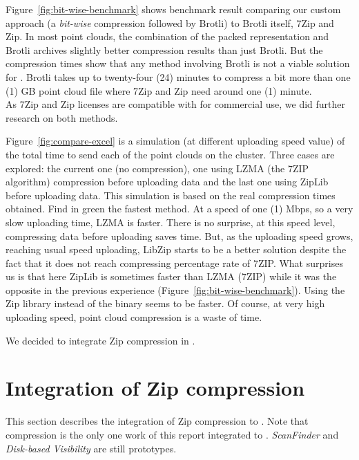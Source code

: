 Figure~\ref{fig:bit-wise-benchmark} shows benchmark result comparing our custom approach (a \emph{bit-wise} compression followed by Brotli) to Brotli itself, 7Zip and Zip. In most point clouds, the combination of the packed representation and Brotli archives slightly better compression results than just Brotli. But the compression times show that any method involving Brotli is not a viable solution for \CC. Brotli takes up to twenty-four (24) minutes to compress a bit more than one (1) GB point cloud file where 7Zip and Zip need around one (1) minute.\\
As 7Zip and Zip licenses are compatible with \CC for commercial use, we did further research on both methods.

Figure~\ref{fig:compare-excel} is a simulation (at different uploading speed value) of the total time to send each of the point clouds on the cluster. Three cases are explored: the current one (no compression), one using LZMA (the 7ZIP algorithm) compression before uploading data and the last one using ZipLib before uploading data. This simulation is based on the real compression times obtained. Find in green the fastest method. At a speed of one (1) Mbps, so a very slow uploading time, LZMA is
faster. There is no surprise, at this speed level, compressing data before uploading saves time. But, as the uploading speed grows, reaching usual speed uploading, LibZip starts to be a better solution despite the fact that it does not reach compressing percentage rate of 7ZIP. What surprises us is that here ZipLib is sometimes faster than LZMA (7ZIP) while it was the opposite in the previous experience (Figure~\ref{fig:bit-wise-benchmark}). Using the Zip library instead of the binary seems to be faster. Of course, at very high uploading speed, point cloud compression is a waste of time.

We decided to integrate Zip compression in \CC.

\section{Integration of Zip compression}
\label{sc:integration}
This section describes the integration of Zip compression to \CC. Note that compression is the only one work of this report integrated to \CC. \emph{ScanFinder} and \emph{Disk-based Visibility} are still prototypes.

